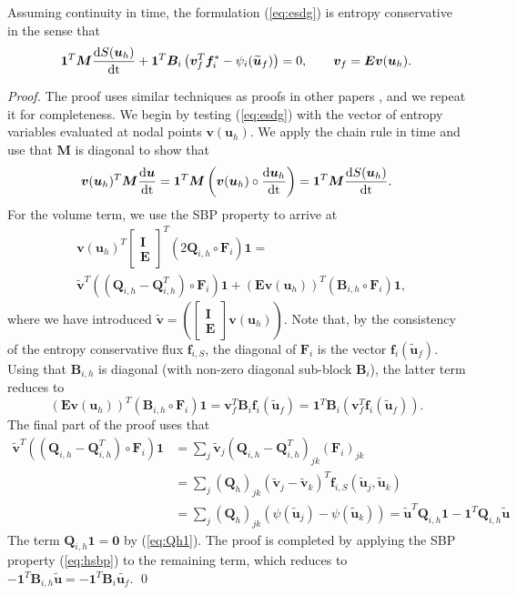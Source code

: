 \documentclass{svjour3}                     %
\renewcommand{\tilde}{\widetilde}
\newcommand{\td}[2]{\frac{{\rm d}#1}{{\rm d}{\rm #2}}}
\newcommand{\LRp}[1]{\left( #1 \right)}
\begin{document}
\begin{theorem}
\label{thm:esdg}
Assuming continuity in time, the formulation (\ref{eq:esdg}) is entropy conservative in the sense that
\[
\bm{1}^T\bm{M}\td{S(\bm{u}_h)}{t} + \bm{1}^T\bm{B}_i\LRp{\bm{v}_f^T\bm{f}_i^* - \psi_i(\tilde{\bm{u}}_f)} = 0, \qquad \bm{v}_f =\bm{E}\bm{v}(\bm{u}_h).
\]
\end{theorem}
\begin{proof}
The proof uses similar techniques as proofs in other papers \cite{chen2017entropy, crean2018entropy, chan2017discretely, chan2019skew}, and we repeat it for completeness.  We begin by testing (\ref{eq:esdg}) with the vector of entropy variables evaluated at nodal points $\bm{v}(\bm{u}_h)$.  We apply the chain rule in time and use that $\bm{M}$ is diagonal to show that 
\[
\bm{v}(\bm{u}_h)^T\bm{M}\td{\bm{u}}{t} = \bm{1}^T\bm{M}\LRp{\bm{v}(\bm{u}_h)\circ \td{\bm{u}_h}{t}} =  \bm{1}^T\bm{M}\td{S(\bm{u}_h)}{t}.
\]
For the volume term, we use the SBP property to arrive at
\begin{align*}
&\bm{v}(\bm{u}_h)^T\begin{bmatrix} \bm{I} \\ \bm{E} \end{bmatrix}^T\LRp{2\bm{Q}_{i,h} \circ \bm{F}_i}\bm{1} = \\
&\tilde{\bm{v}}^T\LRp{\LRp{\bm{Q}_{i,h}-\bm{Q}_{i,h}^T} \circ \bm{F}_i}\bm{1}  + \LRp{\bm{E}\bm{v}(\bm{u}_h)}^T\LRp{\bm{B}_{i,h} \circ\bm{F}_i}\bm{1},
\end{align*}
where we have introduced $\tilde{\bm{v}} = \LRp{\begin{bmatrix} \bm{I} \\ \bm{E} \end{bmatrix}\bm{v}(\bm{u}_h)}$.  
Note that, by the consistency of the entropy conservative flux $\bm{f}_{i,S}$, the diagonal of $\bm{F}_i$ is the vector $\bm{f}_i(\tilde{\bm{u}}_f)$.  Using that $\bm{B}_{i,h}$ is diagonal (with non-zero diagonal sub-block $\bm{B}_i$), the latter term reduces to 
\[
\LRp{\bm{E}\bm{v}(\bm{u}_h)}^T\LRp{\bm{B}_{i,h} \circ\bm{F}_i}\bm{1} = \bm{v}_f^T \bm{B}_i\bm{f}_i(\tilde{\bm{u}}_f) =  \bm{1}^T \bm{B}_i\LRp{\bm{v}_f^T\bm{f}_i(\tilde{\bm{u}}_f)}.
\]
The final part of the proof uses that 
\begin{align*}
\tilde{\bm{v}}^T\LRp{\LRp{\bm{Q}_{i,h}-\bm{Q}_{i,h}^T} \circ \bm{F}_i}\bm{1} &= \sum_j {\tilde{\bm{v}}}_j \LRp{\bm{Q}_{i,h}-\bm{Q}_{i,h}^T}_{jk} \LRp{\bm{F}_{i}}_{jk}\\
&= \sum_j \LRp{\bm{Q}_h}_{jk} \LRp{{\tilde{\bm{v}}}_j-{\tilde{\bm{v}}}_k}^T\bm{f}_{i,S}\LRp{\tilde{\bm{u}}_j,\tilde{\bm{u}}_k}\\
&= \sum_j \LRp{\bm{Q}_h}_{jk} \LRp{\psi(\tilde{\bm{u}}_j)-\psi(\tilde{\bm{u}}_k)} = \tilde{\bm{u}}^T\bm{Q}_{i,h}\bm{1}- \bm{1}^T\bm{Q}_{i,h}\tilde{\bm{u}}
\end{align*}
The term $\bm{Q}_{i,h}\bm{1} = \bm{0}$ by (\ref{eq:Qh1}).  The proof is completed by applying the SBP property (\ref{eq:hsbp}) to the remaining term, which reduces to $-\bm{1}^T\bm{B}_{i,h}\tilde{\bm{u}}=-\bm{1}^T\bm{B}_i\tilde{\bm{u}_f}$.
\qed\end{proof}
\end{document}
